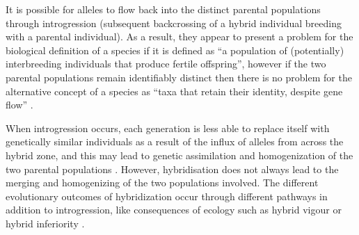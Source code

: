 It is possible for alleles to flow back into the distinct parental populations through introgression (subsequent backcrossing of a hybrid individual breeding with a parental individual).
As a result, they appear to present a problem for the biological definition of a species if it is defined as “a population of (potentially) interbreeding individuals that produce fertile offspring”, however if the two parental populations remain identifiably distinct then there is no problem for the alternative concept of a species as “taxa that retain their identity, despite gene flow” \parencite{Mayr1942}.

When introgression occurs, each generation is less able to replace itself with genetically similar individuals as a result of the influx of alleles from across the hybrid zone, and this may lead to genetic assimilation and homogenization of the two parental populations \parencite{Robbins2014}.
However, hybridisation does not always lead to the merging and homogenizing of the two populations involved.
The different evolutionary outcomes of hybridization occur through different pathways in addition to introgression, like consequences of ecology such as hybrid vigour or hybrid inferiority \parencite{Edmands1999,Johansen-Morris2006,Rieseberg1998}.

